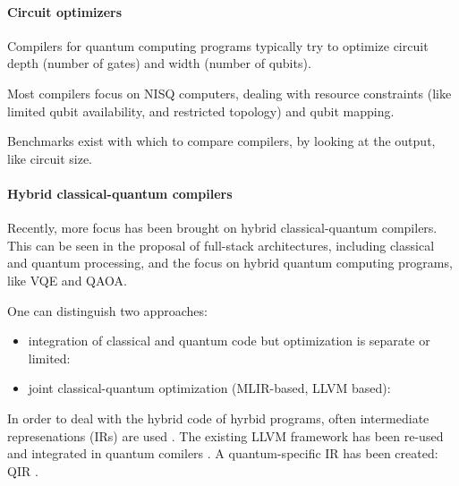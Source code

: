 \paragraph{Circuit optimizers}
Compilers for quantum computing programs typically try to optimize circuit depth (number of gates) and width (number of qubits).

Most compilers focus on \ac{NISQ} computers, dealing with resource constraints (like limited qubit availability, and restricted topology)\cite{chong_programming_2017, murali_full-stack_2019, bandic_full-stack_2022} and qubit mapping\cite{li_tackling_2019, zhang_context, bandic_mapping_2023, nishio_extracting_2020}.

Benchmarks exist with which to compare compilers, by looking at the output, like circuit size.

\paragraph{Hybrid classical-quantum compilers}
Recently, more focus has been brought on hybrid classical-quantum compilers.
This can be seen in the proposal of full-stack architectures, including classical and quantum processing\cite{murali_full-stack_2019, khammassi_openql_2021, mccaskey_xacc_2020}, and the focus on hybrid quantum computing programs, like VQE and QAOA. 

One can distinguish two approaches:
\begin{itemize}
\item integration of classical and quantum code but optimization is separate or limited: \cite{litteken_updated_2020, fux_quingo_2021, khalate_llvm-based_2022, younis_quantum_2022}
\item joint classical-quantum optimization (MLIR-based, LLVM based): \cite{mccaskey_mlir_2021, ittah_enabling_2022, nguyen_retargetable_2022, peduri_qssa_2022}
\end{itemize}

In order to deal with the hybrid code of hyrbid programs, often intermediate represenations (IRs) are used \cite{nigam_compiler_2021, nishio_inquir_2023}.
The existing LLVM framework has been re-used and integrated in quantum comilers \cite{murali_noise-adaptive_2019, murali_full-stack_2019, litteken_updated_2020}.
A quantum-specific IR has been created: QIR \cite{haner_software_2018, geller_introducing_2020}.



